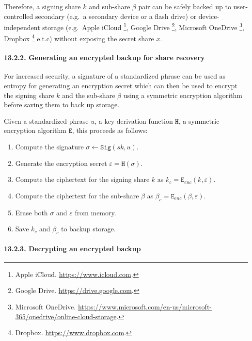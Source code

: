 \documentclass[
]{article}
\providecommand{\tightlist}{%
  \setlength{\itemsep}{0pt}\setlength{\parskip}{0pt}}
\begin{document}
Therefore, a signing share \(k\) and sub-share \(\beta\) pair can be
safely backed up to user-controlled secondary (e.g.~a secondary device
or a flash drive) or device-independent storage (e.g.~Apple iCloud
\footnote{Apple iCloud. \url{https://www.icloud.com}.}, Google Drive
\footnote{Google Drive. \url{https://drive.google.com}.}, Microsoft
OneDrive \footnote{Microsoft OneDrive.
  \url{https://www.microsoft.com/en-us/microsoft-365/onedrive/online-cloud-storage}.},
Dropbox \footnote{Dropbox. \url{https://www.dropbox.com}.} e.t.c)
without exposing the secret share \(x\).

\hypertarget{share-recovery-backup-encrypt}{%
\paragraph{13.2.2. Generating an encrypted backup for share
recovery}\label{share-recovery-backup-encrypt}}

For increased security, a signature of a standardized phrase can be used
as entropy for generating an encryption secret which can then be used to
encrypt the signing share \(k\) and the sub-share \(\beta\) using a
symmetric encryption algorithm before saving them to back up storage.

Given a standardized phrase \(u\), a key derivation function
\(\mathtt{H}\), a symmetric encryption algorithm \(\mathtt{E}\), this
proceeds as follows:

\begin{enumerate}
\def\labelenumi{\arabic{enumi}.}
\tightlist
\item
  Compute the signature \(\sigma \leftarrow \mathtt{Sig}(sk, u)\).
\item
  Generate the encryption secret \(\varepsilon = \mathtt{H}(\sigma)\).
\item
  Compute the ciphertext for the signing share \(k\) as
  \(k_c = \mathtt{E} _{enc}(k, \varepsilon)\).
\item
  Compute the ciphertext for the sub-share \(\beta\) as
  \(\beta _c = \mathtt{E} _{enc}(\beta, \varepsilon)\).
\item
  Erase both \(\sigma\) and \(\varepsilon\) from memory.
\item
  Save \(k_c\) and \(\beta _c\) to backup storage.
\end{enumerate}

\hypertarget{share-recovery-backup-decrypt}{%
\paragraph{13.2.3. Decrypting an encrypted
backup}\label{share-recovery-backup-decrypt}}
\end{document}
